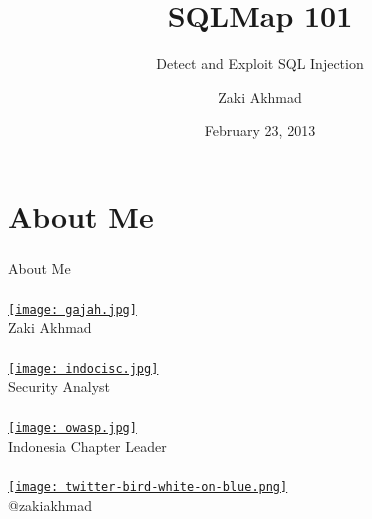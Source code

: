 \documentclass[xcolor=pdftex,table,10pt]{beamer}
\begin{document}
\title{SQLMap 101}
\subtitle{Detect and Exploit SQL Injection}
\author{Zaki Akhmad}
\date{February 23, 2013}

\begin{frame}
	\titlepage
\end{frame}

%

\section{About Me}

\begin{frame}
	\frametitle{}
	\begin{center}
		\LARGE{About Me}
	\end{center}
\end{frame}

\begin{frame}
	\frametitle{}
	\begin{center}
		\href{http://instagram.com/p/T5PWd1SX3o/}{\texttt{[image: gajah.jpg]}} \\
		Zaki Akhmad
	\end{center}
\end{frame}

\begin{frame}
	\frametitle{}
	\begin{center}
		\href{http://www.indocisc.or.id}{\texttt{[image: indocisc.jpg]}} \\
		Security Analyst
	\end{center}
\end{frame}

\begin{frame}
	\frametitle{}
	\begin{center}
		\href{http://owasp.or.id}{\texttt{[image: owasp.jpg]}} \\
		Indonesia Chapter Leader \\
	\end{center}
\end{frame}

\begin{frame}
	\frametitle{}
	\begin{center}
		\href{https://twitter.com/zakiakhmad}{\texttt{[image: twitter-bird-white-on-blue.png]}} \\
		@zakiakhmad \\
	\end{center}
\end{frame}
\end{document}

